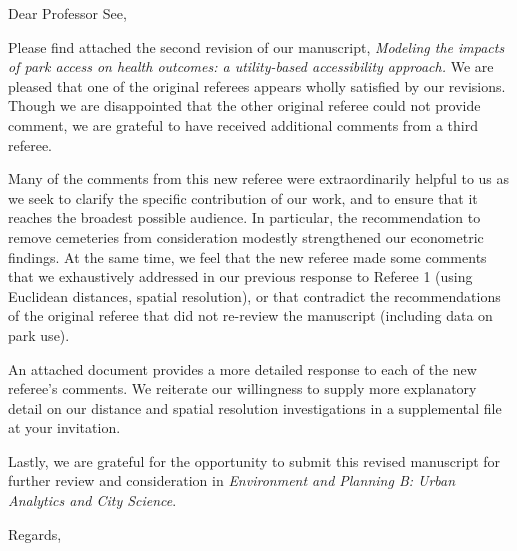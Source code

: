 \documentclass[11pt]{letter} %
\begin{document}

\begin{letter}{
}


\opening{Dear Professor See,}

Please find attached the second revision of our manuscript, \emph{Modeling the impacts of park access on health outcomes: a utility-based accessibility approach.}  We are pleased that one of the original referees appears wholly satisfied by  our revisions. Though we are disappointed that the other original referee could not provide comment, we are grateful to have received additional comments from a third referee.

Many of the comments from this new referee were extraordinarily helpful to us as we seek to clarify the specific contribution of our work, and to ensure that it reaches the broadest possible audience. In particular, the recommendation to remove cemeteries from consideration modestly strengthened our econometric findings. At the same time, we feel that the new referee made some comments that we exhaustively addressed in our previous response to Referee 1 (using Euclidean distances, spatial resolution), or that contradict the recommendations of the original referee that did not re-review the manuscript (including data on park use).

An attached document provides a more detailed response to each of the new referee's comments. We reiterate our willingness to supply more explanatory detail on our distance and spatial resolution investigations in a supplemental file at your invitation.

Lastly, we are grateful for the opportunity to submit this revised manuscript for further review and consideration in {\em Environment and Planning B: Urban Analytics and City Science}.


\closing{Regards,}




\end{letter}
\end{document}
